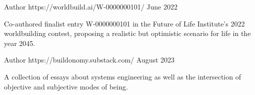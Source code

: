 


\begin{cventries}


\cventry
{Author} %
{} %
{https://worldbuild.ai/W-0000000101/} %
{June 2022} %
{ %
\begin{cvitems}
\item {Co-authored finalist entry W-0000000101 in the Future of Life Institute's 2022 worldbuilding contest, proposing a realistic but optimistic scenario for life in the year 2045.}
\end{cvitems}
}

\cventry
{Author} %
{} %
{https://buildonomy.substack.com/} %
{August 2023} %
{
\begin{cvitems}
\item {A collection of essays about systems engineering as well as the intersection of objective and subjective modes of being.}
\end{cvitems}
}



\end{cventries}
